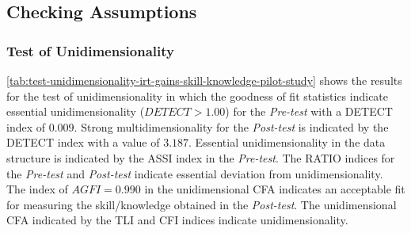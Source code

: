\subsection{Checking Assumptions}

\subsubsection*{Test of Unidimensionality}

\autoref{tab:test-unidimensionality-irt-gains-skill-knowledge-pilot-study} shows the results for the test of unidimensionality in which the goodness of fit statistics indicate essential unidimensionality ($DETECT > 1.00$) for the \emph{Pre-test} with a DETECT index of $0.009$. 
Strong multidimensionality for the \emph{Post-test} is indicated by the DETECT index with a value of $3.187$.
Essential unidimensionality in the data structure is indicated by the ASSI index in the \emph{Pre-test}.
The RATIO indices for the \emph{Pre-test} and \emph{Post-test} indicate essential deviation from unidimensionality.
The index of $AGFI = 0.990$ in the unidimensional CFA indicates an acceptable fit for measuring the skill/knowledge obtained in the \emph{Post-test}. The unidimensional CFA indicated by the TLI and CFI indices indicate unidimensionality.



